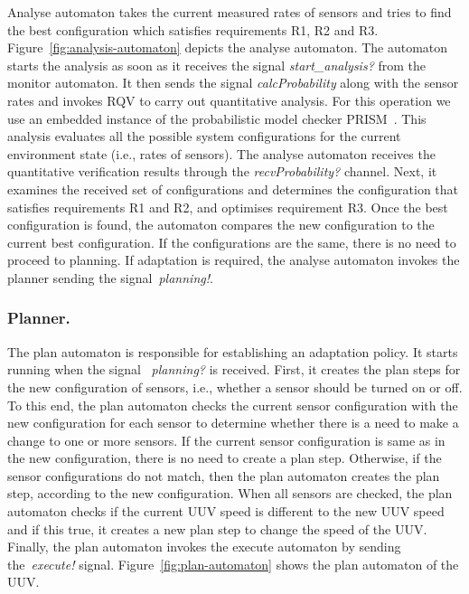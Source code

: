 Analyse automaton takes the current measured rates of sensors and tries to find the best configuration which satisfies requirements R1, R2 and R3. Figure~\ref{fig:analysis-automaton} depicts the analyse automaton. The automaton starts the analysis as soon as it receives the signal \textit{start\_analysis?} from the monitor automaton. It then
sends the signal \textit{calcProbability} along with the sensor rates and invokes RQV to carry out quantitative analysis. For this operation we use an embedded instance of the probabilistic model checker PRISM~\cite{Kwiatkowska2011:CAV}. This analysis evaluates all the possible system configurations for the current environment state (i.e., rates of sensors). The analyse automaton receives the quantitative verification results through the \textit{recvProbability?} channel. Next, it examines the received set of configurations and determines the configuration that satisfies requirements R1 and R2, and optimises requirement R3. Once the best configuration is found, the automaton compares the new configuration to the current best configuration. If the configurations are the same, there is no need to proceed to planning. If adaptation is required, the analyse automaton invokes the planner sending the signal~\textit{planning!}.


\subsubsection{Planner.}
The plan automaton is responsible for establishing an adaptation policy. It starts running when the signal ~\textit{planning?} is received. First, it  creates the plan steps for the new configuration of sensors, i.e., whether a sensor should be turned on or off. To this end, the plan automaton checks the current sensor configuration with the new configuration for each sensor to determine whether there is a need to make a change to one or more sensors. If the current sensor configuration is same as in the new configuration, there is no need to create a plan step. Otherwise, if the sensor configurations do not match, then the plan automaton creates the plan step, according to the new configuration. When all sensors are checked, the plan automaton checks  if the current UUV speed is different to the new UUV speed and if this true, it creates a new plan step to change the speed of the UUV. Finally, the plan automaton invokes the execute automaton by sending the~\textit{execute!} signal. Figure~\ref{fig:plan-automaton} shows the plan automaton of the UUV.

